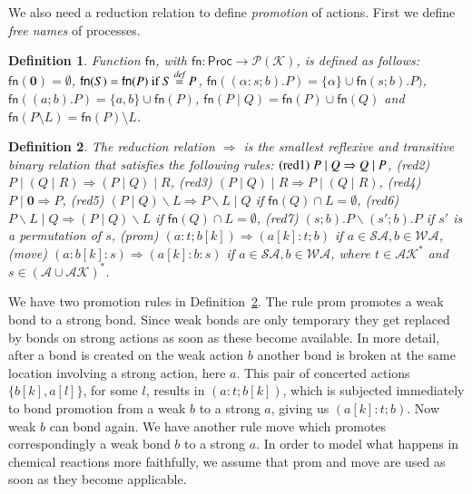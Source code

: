 \documentclass[review]{elsarticle}
\newcommand{\paral}{\; \vert \;}
\newcommand{\Proc}{\mathsf{Proc}}
\newcommand{\Par}{\mid}
\newcommand{\restrict}[1]{\!\setminus\!#1}
\newcommand{\mA}{\mathcal{A}}
\newcommand{\mAK}{\mathcal{AK}}
\newcommand{\rom}[1]{\mbox{\rm{#1}}}
\newcommand{\Nil}{\mathbf{0}}
\newcommand{\Keys}{\mathcal{K}}
\newcommand{\bydef}{\stackrel{\emph{def}}{=}}
\newtheorem{definition}{Definition}
\begin{document}
We also need a reduction relation to define \emph{promotion} of actions. 
First we define {\em free names} of processes.

\begin{definition} \normalfont 
Function $\mathsf{fn}$, with $\mathsf{fn}: \Proc \rightarrow \mathcal{P}(\Keys)$, is defined as follows: $\mathsf{fn}(\Nil) = \emptyset$, $\mathsf{fn}(S)=\mathsf{fn}(P) \text{ if }  S\bydef P$, $\mathsf{fn}((\alpha : s;b).P)=\{\alpha\} \cup \mathsf{fn}(s;b).P)$, $\mathsf{fn}((a;b).P)=\{a,b\} \cup \mathsf{fn}(P) $, $\mathsf{fn}(P\paral Q)=\mathsf{fn}(P) \cup \mathsf{fn}(Q)$ and $\mathsf{fn}(P \restrict L)=\mathsf{fn}(P) \restrict L$.
\end{definition}

\begin{definition}\label{def:reduction}{\rm The reduction relation $\Rightarrow$ is the smallest 
reflexive and transitive binary relation that satisfies the following rules: 
$(\rom{red1})\; P\Par Q \Rightarrow Q\Par P$, (\rom{red2})\; $P\Par (Q\Par R) \Rightarrow 
(P\Par Q)\Par R$, (\rom{red3})\; $(P\Par Q)\Par R \Rightarrow P\Par (Q\Par R)$, (\rom{red4})\;
$P\Par \Nil \Rightarrow P$, (\rom{red5})\; $(P\paral Q)\backslash L \Rightarrow P\backslash L 
\paral Q$  if $\mathsf{fn}(Q) \cap L = \emptyset$, (\rom{red6})\; $P\backslash L \paral Q \Rightarrow 
(P\paral Q)\backslash L$  if $\mathsf{fn}(Q) \cap L = \emptyset$, (\rom{red7})\; $(s;b).P 
\backslash (s';b).P$ if $s'$ is a permutation of $s$, (\rom{prom})\; 
$(a:t;b[k]) \Rightarrow (a[k]:t;b)$ if $a \in \mathcal{SA}, b \in \mathcal{WA}$, 
(\rom{move})\; $(a:b[k]:s) \Rightarrow (a[k]:b:s)$ if  
$a \in \mathcal{SA}, b \in \mathcal{WA}$, where $t\in \mAK^*$ and $s\in (\mA \cup \mAK)^*$.
}
\end{definition}
%
We have two promotion rules in Definition~\ref{def:reduction}. The rule prom
promotes a weak bond to a strong bond. Since weak bonds are only temporary they get replaced by bonds 
on strong actions as soon as these become available. In more detail, after a bond is created on the
weak action $b$ another bond is broken at the same location involving a strong action, here $a$.  
This pair of concerted actions $\{b[k],a[l]\}$, for some $l$, results in $(a:t;b[k])$, which is
subjected immediately to bond promotion from a weak $b$ to a strong $a$, giving us $(a[k]:t;b)$.
Now weak $b$ can bond again. We have another rule move which promotes correspondingly 
a weak bond $b$ to a strong $a$.
In order to model what happens in chemical reactions more faithfully, we assume that prom and move
are used as soon as they become applicable.
\end{document}

